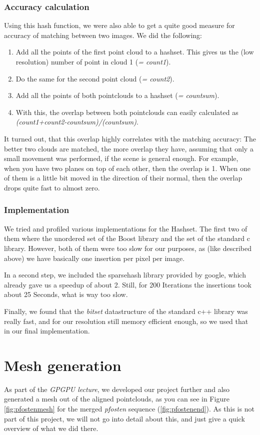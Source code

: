 \documentclass[10pt,twocolumn,letterpaper]{article}
\begin{document}
\subsubsection{Accuracy calculation}
Using this hash function, we were also able to get a quite good measure for accuracy of matching between two images. We did the following:
\begin{enumerate}
\item Add all the points of the first point cloud to a hashset. This gives us the (low resolution) number of point in cloud 1 (\textit{= count1}).
\item Do the same for the second point cloud (\textit{= count2}).
\item Add all the points of both pointclouds to a hashset (\textit{= countsum}).
\item With this, the overlap between both pointclouds can easily calculated as \textit{(count1+count2-countsum)/(countsum)}.
\end{enumerate}
It turned out, that this overlap highly correlates with the matching accuracy: The better two clouds are matched, the more overlap they have, assuming
that only a small movement was performed, if the scene is general enough. For example, when you have two planes on top of each other, then the overlap
is 1. When one of them is a little bit moved in the direction of their normal, then the overlap drops quite fast to almost zero.

\subsubsection{Implementation}
We tried and profiled various implementations for the Hashset. The first two of them where the unordered set of the Boost library and the set of the
standard c library. However, both of them were too slow for our purposes, as (like described above) we have basically one insertion per pixel per image.

In a second step, we included the sparsehash library provided by google, which already gave us a speedup of about 2. Still, for 200 Iterations the
insertions took about 25 Seconds, what is way too slow.

Finally, we found that the \textit{bitset} datastructure of the standard c++ library was really fast, and for our resolution still memory efficient enough,
so we used that in our final implementation.

\section{Mesh generation}
As part of the \textit{GPGPU lecture}, we developed our project further and also generated a mesh out of the aligned pointclouds, as you can see in
Figure \ref{fig:pfostenmesh} for the merged \textit{pfosten} sequence (\ref{fig:pfostenend}).
As this is not part of this project, we will not go into detail about this, and just give a quick overview of what we did there.
\end{document}
